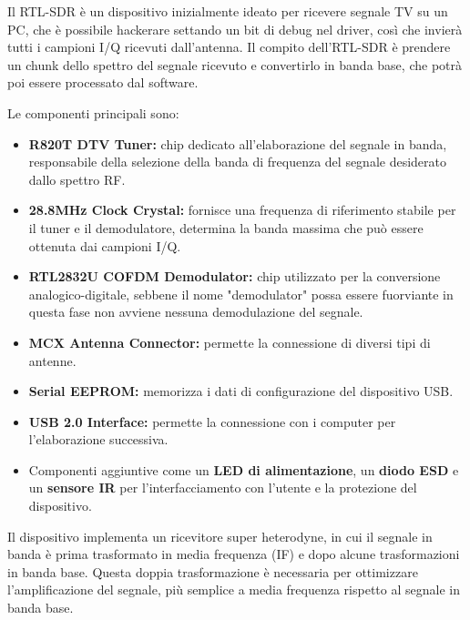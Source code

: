 Il RTL-SDR è un dispositivo inizialmente ideato per ricevere segnale TV su un PC, che è possibile hackerare settando un bit di debug nel driver, così che invierà tutti i campioni I/Q ricevuti dall'antenna. 
Il compito dell'RTL-SDR è prendere un chunk dello spettro del segnale ricevuto e convertirlo in banda base, che potrà poi essere processato dal software.

Le componenti principali sono:
\begin{itemize}
    \item \textbf{R820T DTV Tuner:} chip dedicato all'elaborazione del segnale in banda, responsabile della selezione della banda di frequenza del segnale desiderato dallo spettro RF.
    \item \textbf{28.8MHz Clock Crystal:} fornisce una frequenza di riferimento stabile per il tuner e il demodulatore, determina la banda massima che può essere ottenuta dai campioni I/Q.
    \item \textbf{RTL2832U COFDM Demodulator:} chip utilizzato per la conversione analogico-digitale, sebbene il nome "demodulator" possa essere fuorviante in questa fase non avviene nessuna demodulazione del segnale.
    \item \textbf{MCX Antenna Connector:} permette la connessione di diversi tipi di antenne.
    \item \textbf{Serial EEPROM:} memorizza i dati di configurazione del dispositivo USB.
    \item \textbf{USB 2.0 Interface:} permette la connessione con i computer per l'elaborazione successiva.
    \item Componenti aggiuntive come un \textbf{LED di alimentazione}, un \textbf{diodo ESD} e un \textbf{sensore IR} per l'interfacciamento con l'utente e la protezione del dispositivo.
\end{itemize}

Il dispositivo implementa un ricevitore super heterodyne, in cui il segnale in banda è prima trasformato in media frequenza (IF) e dopo alcune trasformazioni in banda base.
Questa doppia trasformazione è necessaria per ottimizzare l'amplificazione del segnale, più semplice a media frequenza rispetto al segnale in banda base.

